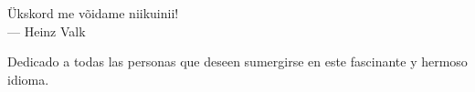 
\thispagestyle{empty}


\vspace*{3cm}

\begin{center}
\foreignlanguage{estonian}{Ükskord me võidame niikuinii!} \\ \medskip
--- Heinz Valk
\end{center}

\medskip

\begin{center}
Dedicado a todas las personas que deseen sumergirse en este fascinante y hermoso idioma.
\end{center}
